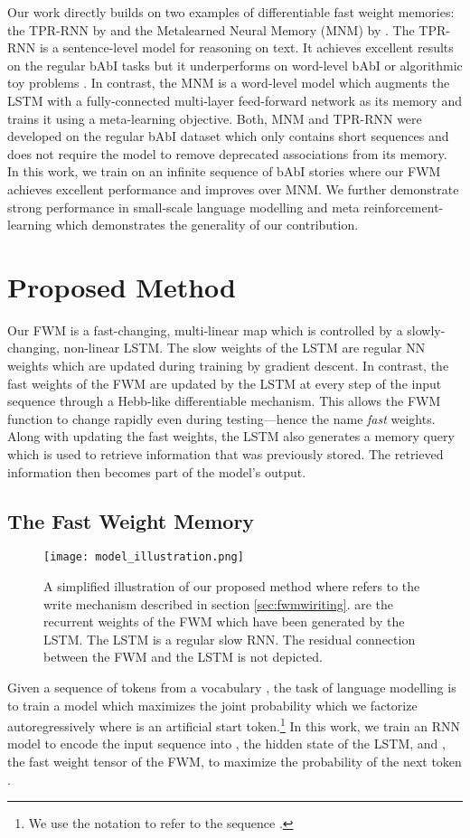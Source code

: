 \documentclass{article} \usepackage{iclr2021_conference,times}
\begin{document}
Our work directly builds on two examples of differentiable fast weight memories: the TPR-RNN by \citet{schlag2018nips} and the Metalearned Neural Memory (MNM) by \citet{munkhdalai2019metalearned}. 
The TPR-RNN is a sentence-level model for reasoning on text. It achieves excellent results on the regular bAbI tasks but it underperforms on word-level bAbI \citep{schlag2019enhancing} or algorithmic toy problems \citep{le2020self}.
In contrast, the MNM is a word-level model which augments the LSTM with a fully-connected multi-layer feed-forward network as its memory and trains it using a meta-learning objective.
Both, MNM and TPR-RNN were developed on the regular bAbI dataset which only contains short sequences and does not require the model to remove deprecated associations from its memory.
In this work, we train on an infinite sequence of bAbI stories where our FWM achieves excellent performance and improves over MNM. 
We further demonstrate strong performance in small-scale language modelling and meta reinforcement-learning which demonstrates the generality of our contribution.

\section{Proposed Method}
\label{sec:method}
Our FWM is a fast-changing, multi-linear map which is controlled by a slowly-changing, non-linear LSTM. 
The slow weights of the LSTM are regular NN weights which are updated during training by gradient descent.
In contrast, the fast weights of the FWM are updated by the LSTM at every step of the input sequence through a Hebb-like differentiable mechanism. 
This allows the FWM function to change rapidly even during testing---hence the name \textit{fast} weights. 
Along with updating the fast weights, the LSTM also generates a memory query which is used to retrieve information that was previously stored.
The retrieved information then becomes part of the model's output. 
\subsection{The Fast Weight Memory}
\begin{wrapfigure}{r}{6cm}
  \vspace{-20pt}
  \centering
  \texttt{[image: model\_illustration.png]}
\caption{A simplified illustration of our proposed method where  refers to the write mechanism described in section \ref{sec:fwmwiriting}.  are the recurrent weights of the FWM which have been generated by the LSTM. The LSTM is a regular slow RNN. The residual connection between the FWM and the LSTM is not depicted.}
  \label{fig:illustration}
  \vspace{-0.5cm}
\end{wrapfigure}
Given a sequence of tokens  from a vocabulary , the task of language modelling is to train a model which maximizes the joint probability  which we factorize autoregressively  where  is an artificial start token.\footnote{We use the notation  to refer to the sequence .}
In this work, we train an RNN model to encode the input sequence  into , the hidden state of the LSTM, and , the fast weight tensor of the FWM, to maximize the probability of the next token .
\end{document}
